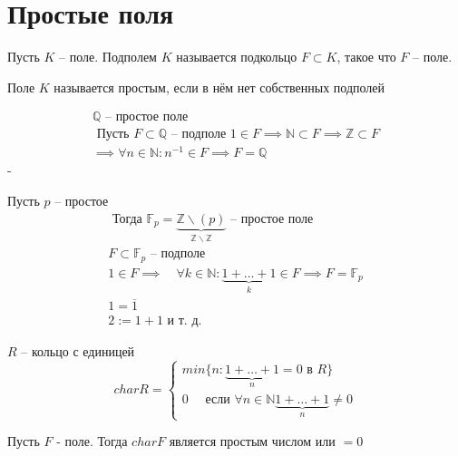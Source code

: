 \documentclass[main]{subfiles}
\begin{document}
\chapter{Простые поля}

\begin{definition}[Подполе]
    Пусть $K$ -- поле. Подполем $K$ называется подкольцо $F \subset K$, такое что
     $F$ -- поле.
\end{definition}

\begin{definition}
    Поле $K$ называется простым, если в нём нет собственных подполей
\end{definition}

\begin{example}
    \begin{gather*}
        \mathbb{Q} \text{ -- простое поле } \\
        \text{ Пусть } F \subset \mathbb{Q} \text{ -- подполе }
        1 \in F \implies \mathbb{N} \subset F \implies \mathbb{Z} \subset F \\
        \implies \forall n \in \mathbb{N} : n^{-1} \in F \implies F = \mathbb{Q}
    \end{gather*}-
\end{example}
\begin{example}
    Пусть $p$ -- простое
    \begin{gather*}
        \text{ Тогда } \mathbb{F}_p = \underbrace{\mathbb{Z} \backslash (p)}_{\mathbb{Z}\backslash \mathbb{Z}} \text{ -- простое поле }\\
        F \subset \mathbb{F}_p \text{ -- подполе} \\
        1 \in F \implies \quad \forall k \in \mathbb{N} : \underbrace{1 + \ldots + 1 }_{k} \in F  \implies F = \mathbb{F}_p\\
        1 = \overline{1}\\
        2 := 1 + 1 \text{ и т. д.}
    \end{gather*}
\end{example}

\begin{definition}
    $R$ -- кольцо с единицей
        \[char R = \begin{cases}
            min \{ n : \underbrace{1 + \ldots + 1}_n = 0 \text{ в } R \} \\
            0 \quad \text{ если } \forall n \in \mathbb{N} \underbrace{1 + \ldots + 1}_n \ne 0
        \end{cases}
    \]
\end{definition}
\begin{lemma}
    Пусть $F$ - поле. Тогда $char F$ является простым числом или $= 0$
\end{lemma}
\end{document}
